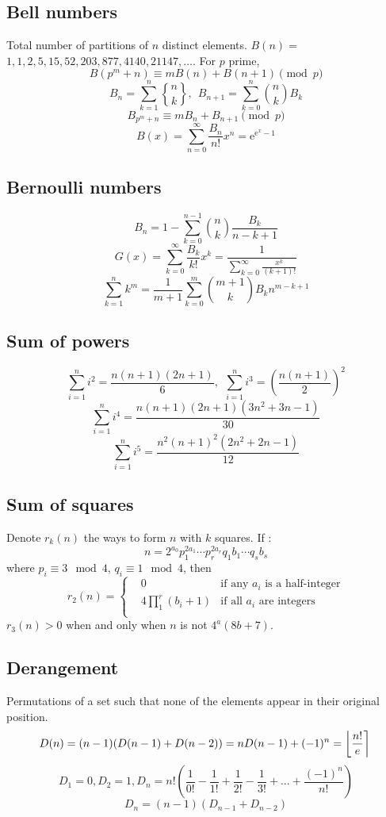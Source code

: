 	\subsection{Bell numbers}
  Total number of partitions of $n$ distinct elements. $B(n) =$
  $1, 1, 2, 5, 15, 52, 203, 877, 4140, 21147, \dots$. For $p$ prime,
  \[ B(p^m+n)\equiv mB(n)+B(n+1) \pmod{p} \]
	\[ B_n=\sum_{k=1}^{n}{n\brace k},\ \ B_{n+1} = \sum_{k=0}^n{n \choose k}B_k \]
	\[ B_{p^m+n} \equiv mB_n+B_{n+1} \pmod{p} \]
	\[B(x)=\sum_{n=0}^{\infty}\frac{B_n}{n!}x^n=\mathrm{e}^{\mathrm{e}^x-1}\]
	\subsection{Bernoulli numbers}
	\[ B_n = 1 - \sum_{k=0}^{n-1}{n \choose k}\frac{B_k}{n-k+1} \]
	\[ G(x) = \sum_{k=0}^{\infty}\frac{B_k}{k!}x^k
	= \frac{1}{\sum_{k=0}^{\infty}\frac{x^k}{(k+1)!}} \]
	\[ \sum_{k=1}^nk^m = \frac{1}{m+1}\sum_{k=0}^m{m+1 \choose k}B_kn^{m-k+1} \]
	\subsection{Sum of powers}
	\[\sum_{i=1}^ni^2=\frac{n(n+1)(2n+1)}{6},\ \ \sum_{i=1}^ni^3=(\frac{n(n+1)}{2})^2\]
	\[\sum_{i=1}^ni^4=\frac{n(n+1)(2n+1)(3n^2+3n-1)}{30}\]
	\[\sum_{i=1}^ni^5=\frac{n^2(n+1)^2(2n^2+2n-1)}{12}\]
	\subsection{Sum of squares}
	Denote $r_k(n)$ the ways to form $n$ with $k$ squares. If :
	\[n=2^{a_0}p_1^{2a_1}\cdots p_r^{2a_r}q_1{b_1}\cdots q_s{b_s}\]
	where $p_i\equiv 3 \mod 4$, $q_i\equiv 1 \mod 4$, then
	\[r_2(n)=\left\{\begin{aligned}
	& 0 & \text{if any }a_i\text{ is a half-integer}\\
	& 4\prod_1^r(b_i+1) & \text{if all }a_i\text{ are integers}\\
	\end{aligned}\right.\]
	$r_3(n)>0$ when and only when $n$ is not $4^a(8b+7)$.
	\subsection{Derangement}
  Permutations of a set such that none of the elements appear in their original position.
  \[ \mkern-2mu D(n) = (n-1)(D(n-1)+D(n-2)) = n D(n-1)+(-1)^n = \left\lfloor\frac{n!}{e}\right\rceil \]
	\[D_1=0,D_2=1,D_n=n!(\frac{1}{0!}-\frac{1}{1!}+\frac{1}{2!}-\frac{1}{3!}+...+\frac{(-1)^n}{n!})\]
	\[D_n=(n-1)(D_{n-1}+D_{n-2})\]
